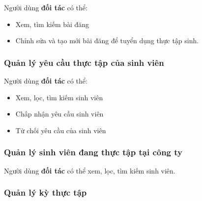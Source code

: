 \documentclass[./../main.tex]{subfiles}
\begin{document}
Người dùng \textbf{đối tác} có thể:
  
\begin{itemize}
	\item
	      
	      	Xem, tìm kiếm bài đăng
	      
	\item
	      
	      	Chỉnh sửa và tạo mới bài đăng để tuyển dụng thực tập sinh.
	      
\end{itemize}
  
\hypertarget{quux1ea3n-luxfd-yuxeau-cux1ea7u-thux1ef1c-tux1eadp-cux1ee7a-sinh-viuxean}{%
	\subsubsection{Quản lý yêu cầu thực tập của sinh
		viên}\label{quux1ea3n-luxfd-yuxeau-cux1ea7u-thux1ef1c-tux1eadp-cux1ee7a-sinh-viuxean}}
  
Người dùng \textbf{đối tác} có thể:
  
\begin{itemize}
	\item
	      
	      	Xem, lọc, tìm kiếm sinh viên
	      
	\item
	      
	      	Chấp nhận yêu cầu sinh viên
	      
	\item
	      
	      	Từ chối yêu cầu của sinh viên
	      
\end{itemize}
  
\hypertarget{quux1ea3n-luxfd-sinh-viuxean-ux111ang-thux1ef1c-tux1eadp-tux1ea1i-cuxf4ng-ty}{%
	\subsubsection{Quản lý sinh viên đang thực tập tại công
		ty}\label{quux1ea3n-luxfd-sinh-viuxean-ux111ang-thux1ef1c-tux1eadp-tux1ea1i-cuxf4ng-ty}}
  
Người dùng \textbf{đối tác} có thể xem, lọc, tìm kiếm sinh viên.
  
\hypertarget{quux1ea3n-luxfd-kux1ef3-thux1ef1c-tux1eadp}{%
	\subsubsection{Quản lý kỳ thực
		tập}\label{quux1ea3n-luxfd-kux1ef3-thux1ef1c-tux1eadp}}
  
\end{document}
